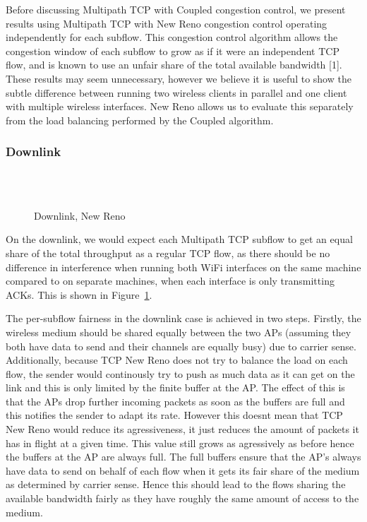 Before discussing Multipath TCP with Coupled congestion control, we present
results using Multipath TCP with New Reno congestion control operating
independently for each subflow. This congestion control algorithm allows the
congestion window of each subflow to grow as if it were an independent TCP flow,
and is known to use an unfair share of the total available bandwidth [1]. These
results may seem unnecessary, however we believe it is useful to show
the subtle difference between running two wireless clients in parallel and one
client with multiple wireless interfaces. New Reno allows us to evaluate this
separately from the load balancing performed by the Coupled algorithm.


\subsubsection{Downlink}
\label{sec:results-mptcp-down}

\begin{figure}[h]
  \centering
  \\
  \subfloat[][2.4 GHz, non-overlapping channels] {\
    \scalebox{0.70}{}\label{graph:cc-reno-down}
  }
  \\
  \subfloat[][5 and 2.4 GHz] {\
    \scalebox{0.70}{}\label{graph:cb-reno-down}
  }
  \caption{Downlink, New Reno}\label{graph:reno-down}
\end{figure}

On the downlink, we would expect each Multipath TCP subflow to get an equal
share of the total throughput as a regular TCP flow, as there should be no
difference in interference when running both WiFi interfaces on the same machine
compared to on separate machines, when each interface is only transmitting ACKs.
This is shown in Figure~\ref{graph:reno-down}.

The per-subflow fairness in the downlink case is achieved in two steps. Firstly,
the wireless medium should be shared equally between the two APs (assuming they
both have data to send and their channels are equally busy) due to carrier
sense. Additionally, because TCP New Reno does not try to balance the load on 
each flow, the sender would continously try to push as much data as it can get 
on the link and this is only limited by the finite buffer at the AP. The effect 
of this is that the APs drop further incoming packets as soon as the buffers are 
full and this notifies the sender to adapt its rate. However this doesnt mean 
that TCP New Reno would reduce its agressiveness, it just reduces the amount of 
packets it has in flight at a given time. This value still grows as agressively 
as before hence the buffers at the AP are always full. The full buffers ensure 
that the AP's always have data to send on behalf of each flow when it gets its 
fair share of the medium as determined by carrier sense. Hence this should lead 
to the flows sharing the available bandwidth fairly as they have roughly the 
same amount of access to the medium.

